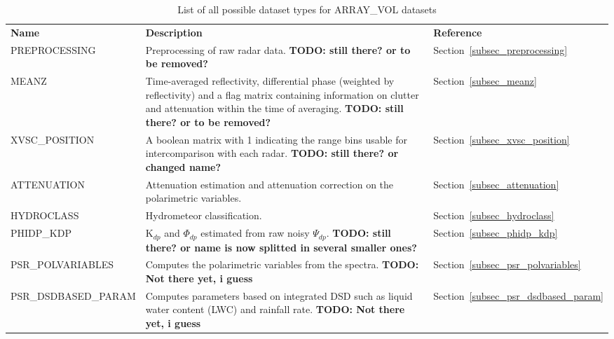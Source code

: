 \documentclass[a4paper,11pt,pdftex,twoside]{scrartcl}
\renewcommand{\bf}{\normalfont \bfseries}
\begin{document}
{{{\begin{table}[H]
\begin{tabularx}{\textwidth}{lXl}
\bf{Name}                 & \bf{Description}                                                                                                                                & \bf{Reference}\\
PREPROCESSING        & Preprocessing of raw radar data.   {\bf TODO: still there? or to be removed? }                                     & Section~\ref{subsec_preprocessing}\\
MEANZ                   & Time-averaged reflectivity, differential phase (weighted by reflectivity) and a flag matrix containing information on clutter and attenuation within the time of averaging.  {\bf TODO: still there? or to be removed? }                                      & Section~\ref{subsec_meanz}\\
XVSC\_POSITION           & A boolean matrix with 1 indicating the range bins usable for intercomparison with each radar.  {\bf TODO: still there? or changed name? }                                                                                            & Section~\ref{subsec_xvsc_position}\\
ATTENUATION             & Attenuation estimation and attenuation correction on the polarimetric variables.                                                                     & Section~\ref{subsec_attenuation}\\
HYDROCLASS             & Hydrometeor classification.                                                                                                        & Section~\ref{subsec_hydroclass}\\
PHIDP\_KDP                & K$_{dp}$ and $\Phi_{dp}$ estimated from raw noisy $\Psi_{dp}$.  {\bf TODO: still there? or name is now splitted in several smaller ones? }   & Section~\ref{subsec_phidp_kdp}\\
PSR\_POLVARIABLES        & Computes the polarimetric variables from the spectra. {\bf TODO: Not there yet, i guess}                     & Section~\ref{subsec_psr_polvariables}\\
PSR\_DSDBASED\_PARAM    & Computes parameters based on integrated DSD such as liquid water content (LWC) and rainfall rate.  {\bf TODO: Not there yet, i guess}                                                  & Section~\ref{subsec_psr_dsdbased_param}\\
\end{tabularx}
\caption{List of all possible dataset types for ARRAY\_VOL datasets}
\label{tab_datasets_ARRAY_VOL}
\end{table}

}}}
\end{document}
